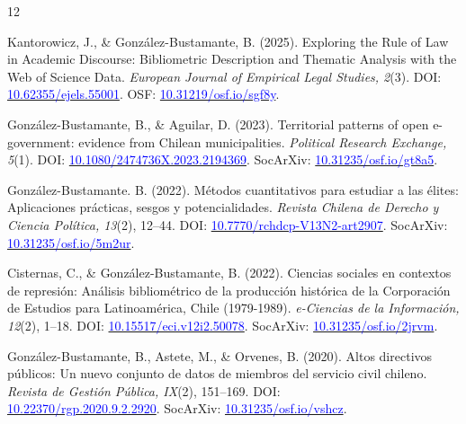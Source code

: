 \begin{publications}

\begin{benumerate}{12}

\item{Kantorowicz, J., \& González-Bustamante, B. (2025). Exploring the Rule of Law in Academic Discourse: Bibliometric Description and Thematic Analysis with the Web of Science Data. {\itshape European Journal of Empirical Legal Studies, 2}(3). DOI: \href{https://doi.org/10.62355/ejels.55001}{\textcolor{blue}{10.62355/ejels.55001}}. OSF: \href{https://doi.org/10.31219/osf.io/sgf8y}{\textcolor{blue}{10.31219/osf.io/sgf8y}}.}\vspace{1mm}

\item{González-Bustamante, B., \& Aguilar, D. (2023). Territorial patterns of open e-government: evidence from Chilean municipalities. {\itshape Political Research Exchange, 5}(1). DOI: \href{https://doi.org/10.1080/2474736X.2023.2194369}{\textcolor{blue}{10.1080/2474736X.2023.2194369}}. SocArXiv: \href{https://doi.org/10.31235/osf.io/gt8a5}{\textcolor{blue}{10.31235/osf.io/gt8a5}}.}\vspace{1mm}

\item{González-Bustamante. B. (2022). Métodos cuantitativos para estudiar a las élites: Aplicaciones prácticas, sesgos y potencialidades. {\itshape Revista Chilena de Derecho y Ciencia Política, 13}(2), 12--44. DOI: \href{https://doi.org/10.7770/rchdcp-V13N2-art2907}{\textcolor{blue}{10.7770/rchdcp-V13N2-art2907}}. SocArXiv: \href{https://doi.org/10.31235/osf.io/5m2ur}{\textcolor{blue}{10.31235/osf.io/5m2ur}}.}\vspace{1mm}

\item{Cisternas, C., \& González-Bustamante, B. (2022). Ciencias sociales en contextos de represión: Análisis bibliométrico de la producción histórica de la Corporación de Estudios para Latinoamérica, Chile (1979-1989). {\itshape e-Ciencias de la Información, 12}(2), 1--18. DOI: \href{https://doi.org/10.15517/eci.v12i2.50078}{\textcolor{blue}{10.15517/eci.v12i2.50078}}. SocArXiv: \href{https://doi.org/10.31235/osf.io/2jrvm}{\textcolor{blue}{10.31235/osf.io/2jrvm}}.}\vspace{1mm} %

\item{González-Bustamante, B., Astete, M., \& Orvenes, B. (2020). Altos directivos públicos: Un nuevo conjunto de datos de miembros del servicio civil chileno. {\itshape Revista de Gestión Pública, IX}(2), 151--169. DOI: \\ \href{https://doi.org/10.22370/rgp.2020.9.2.2920}{\textcolor{blue}{10.22370/rgp.2020.9.2.2920}}. SocArXiv: \href{https://doi.org/10.31235/osf.io/vshcz}{\textcolor{blue}{10.31235/osf.io/vshcz}}.}\vspace{1mm}


\end{benumerate}
\end{publications}
